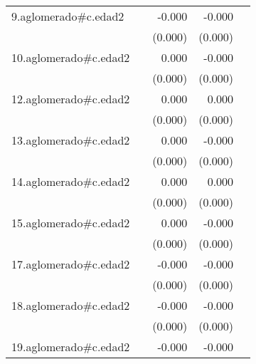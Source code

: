 {\begin{longtable}{l*{4}{D{.}{.}{-1}}}
\addlinespace
9.aglomerado#c.edad2&                     &      -0.000\sym{*}  &      -0.000\sym{***}&                     \\
            &                     &     (0.000)         &     (0.000)         &                     \\
\addlinespace
10.aglomerado#c.edad2&                     &       0.000         &      -0.000         &                     \\
            &                     &     (0.000)         &     (0.000)         &                     \\
\addlinespace
12.aglomerado#c.edad2&                     &       0.000\sym{**} &       0.000\sym{*}  &                     \\
            &                     &     (0.000)         &     (0.000)         &                     \\
\addlinespace
13.aglomerado#c.edad2&                     &       0.000         &      -0.000\sym{**} &                     \\
            &                     &     (0.000)         &     (0.000)         &                     \\
\addlinespace
14.aglomerado#c.edad2&                     &       0.000\sym{*}  &       0.000         &                     \\
            &                     &     (0.000)         &     (0.000)         &                     \\
\addlinespace
15.aglomerado#c.edad2&                     &       0.000         &      -0.000         &                     \\
            &                     &     (0.000)         &     (0.000)         &                     \\
\addlinespace
17.aglomerado#c.edad2&                     &      -0.000         &      -0.000         &                     \\
            &                     &     (0.000)         &     (0.000)         &                     \\
\addlinespace
18.aglomerado#c.edad2&                     &      -0.000         &      -0.000         &                     \\
            &                     &     (0.000)         &     (0.000)         &                     \\
\addlinespace
19.aglomerado#c.edad2&                     &      -0.000         &      -0.000\sym{**} &                     \\

\end{longtable}}
